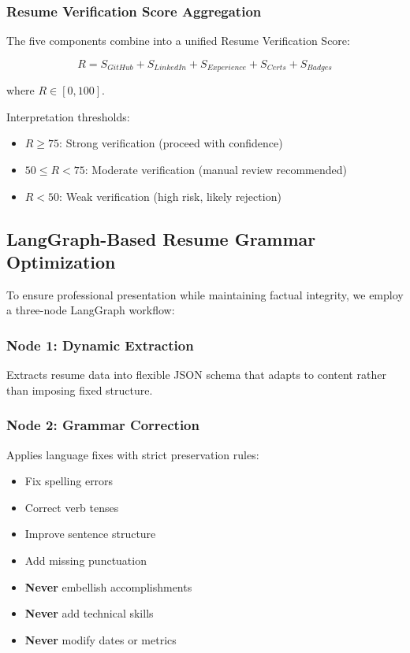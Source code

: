 \documentclass[conference]{IEEEtran}
\begin{document}
\subsubsection{Resume Verification Score Aggregation}

The five components combine into a unified Resume Verification Score:

\begin{equation}
R = S_{GitHub} + S_{LinkedIn} + S_{Experience} + S_{Certs} + S_{Badges}
\end{equation}

where $R \in [0, 100]$.

Interpretation thresholds:
\begin{itemize}
    \item $R \geq 75$: Strong verification (proceed with confidence)
    \item $50 \leq R < 75$: Moderate verification (manual review recommended)
    \item $R < 50$: Weak verification (high risk, likely rejection)
\end{itemize}

\subsection{LangGraph-Based Resume Grammar Optimization}

To ensure professional presentation while maintaining factual integrity, we employ a three-node LangGraph workflow:

\subsubsection{Node 1: Dynamic Extraction}

Extracts resume data into flexible JSON schema that adapts to content rather than imposing fixed structure.

\subsubsection{Node 2: Grammar Correction}

Applies language fixes with strict preservation rules:
\begin{itemize}
    \item Fix spelling errors
    \item Correct verb tenses
    \item Improve sentence structure
    \item Add missing punctuation
    \item \textbf{Never} embellish accomplishments
    \item \textbf{Never} add technical skills
    \item \textbf{Never} modify dates or metrics
\end{itemize}
\end{document}
